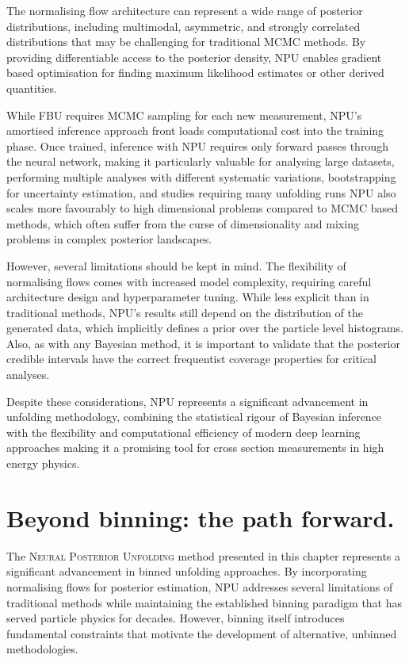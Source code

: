     The normalising flow architecture can represent a wide range of posterior distributions, including multimodal, asymmetric, and strongly correlated distributions that may be challenging for traditional MCMC methods.
    By providing differentiable access to the posterior density, NPU enables gradient based optimisation for finding maximum likelihood estimates or other derived quantities.

    While FBU requires MCMC sampling for each new measurement, NPU's amortised inference approach front loads computational cost into the training phase.
    Once trained, inference with NPU requires only forward passes through the neural network, making it particularly valuable for analysing large datasets, performing multiple analyses with different systematic variations, bootstrapping for uncertainty estimation, and studies requiring many unfolding runs
    NPU also scales more favourably to high dimensional problems compared to MCMC based methods, which often suffer from the curse of dimensionality and mixing problems in complex posterior landscapes.
    
    However, several limitations should be kept in mind.
    The flexibility of normalising flows comes with increased model complexity, requiring careful architecture design and hyperparameter tuning.
    While less explicit than in traditional methods, NPU's results still depend on the distribution of the generated data, which implicitly defines a prior over the particle level histograms.
    Also, as with any Bayesian method, it is important to validate that the posterior credible intervals have the correct frequentist coverage properties for critical analyses.
    
    Despite these considerations, NPU represents a significant advancement in unfolding methodology, combining the statistical rigour of Bayesian inference with the flexibility and computational efficiency of modern deep learning approaches making it a promising tool for cross section measurements in high energy physics.

\section{Beyond binning: the path forward.}
    The \textsc{Neural Posterior Unfolding} method presented in this chapter represents a significant advancement in binned unfolding approaches.
    By incorporating normalising flows for posterior estimation, NPU addresses several limitations of traditional methods while maintaining the established binning paradigm that has served particle physics for decades.
    However, binning itself introduces fundamental constraints that motivate the development of alternative, unbinned methodologies.

